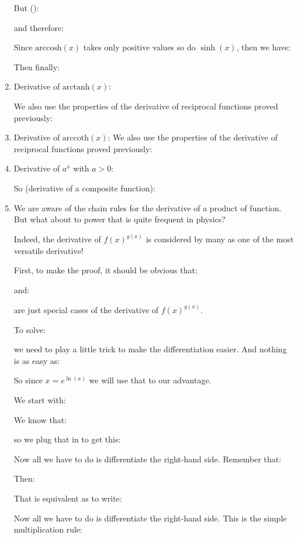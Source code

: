\begin{enumerate}
		 	But ():
		 	
		 	and therefore:
		 	
		 	Since $\text{arccosh}(x)$ takes only positive values so do $\sinh(x)$, then we have:
		 	
		 	Then finally:
		 	
		 	
		 	\item Derivative of $\text{arctanh}(x)$:
		 	
		 	We also use the properties of the derivative of reciprocal functions proved previously:
		 	
		 	
		 	\item Derivative of $\text{arccoth}(x)$:
		 	We also use the properties of the derivative of reciprocal functions proved previously:
		 	
		 	
		 	\item Derivative of $a^x$ with $a>0$:
		 	
		 	So (derivative of a composite function):
		 	
		 	
		 	\item We are aware of the chain rules for the derivative of a product of function. But what about to power that is quite frequent in physics?
	
			Indeed, the derivative of $f(x)^{g(x)}$ is considered by many as one of the most versatile derivative!
			
			First, to make the proof, it should be obvious that:
			
			and:
			
		 	are just special cases of the derivative of $f(x)^{g(x)}$.
		 	
		 	To solve:
		 	
			 we need to play a little trick to make the differentiation easier. And nothing is as easy as:
			 
			So since $x = e^{\ln(x)}$ we will use that to our advantage.
			
			We start with:
			
			We know that:
			
			so we plug that in to get this:
			
			Now all we have to do is differentiate the right-hand side. 
		Remember that:
			
			Then:
			
			That is equivalent as to write:
			
		   Now all we have to do is differentiate the right-hand side. This is the simple multiplication rule:
			

\end{enumerate}
